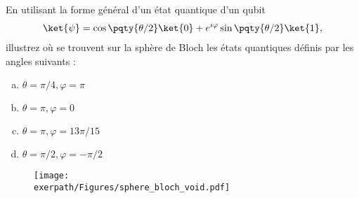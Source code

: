 En utilisant la forme général d'un état quantique d'un qubit
\begin{align*}
    \ket{\psi} = \cos\pqty{\theta/2}\ket{0} + e^{i\varphi}\sin\pqty{\theta/2}\ket{1},
\end{align*}
illustrez où se trouvent sur la sphère de Bloch les états quantiques définis par les angles suivants :
\begin{multicols}{2}
    \begin{enumerate}[a)]
        \item $\theta = \pi/4, \varphi = \pi$
        \item $\theta = \pi, \varphi = 0$
        \item $\theta = \pi, \varphi = 13\pi/15$
        \item $\theta = \pi/2, \varphi = -\pi/2$
    \end{enumerate}
\end{multicols}
\begin{figure}[h]
    \centering
    \texttt{[image: \\exerpath/Figures/sphere\_bloch\_void.pdf]}
\end{figure}